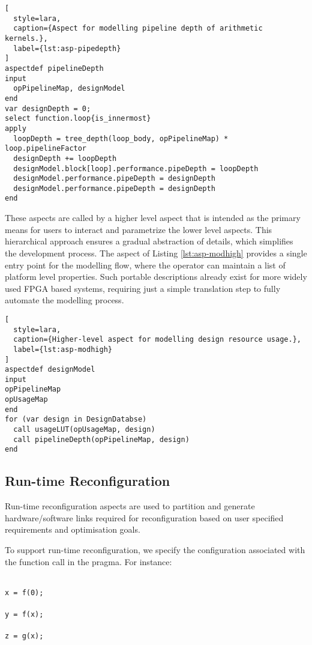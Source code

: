 \begin{lstlisting}[
  style=lara,
  caption={Aspect for modelling pipeline depth of arithmetic kernels.},
  label={lst:asp-pipedepth}
]
aspectdef pipelineDepth
input
  opPipelineMap, designModel
end
var designDepth = 0;
select function.loop{is_innermost}
apply
  loopDepth = tree_depth(loop_body, opPipelineMap) * loop.pipelineFactor
  designDepth += loopDepth
  designModel.block[loop].performance.pipeDepth = loopDepth
  designModel.performance.pipeDepth = designDepth
  designModel.performance.pipeDepth = designDepth
end
\end{lstlisting}

These aspects are called by a higher level aspect that is intended as
the primary means for users to interact and parametrize the lower
level aspects. This hierarchical approach ensures a gradual
abstraction of details, which simplifies the development process.  The
aspect of Listing \ref{lst:asp-modhigh} provides a single entry point
for the modelling flow, where the operator can maintain a list of
platform level properties. Such portable descriptions already exist
for more widely used FPGA based systems, requiring just a simple
translation step to fully automate the modelling process.

\begin{lstlisting}[
  style=lara,
  caption={Higher-level aspect for modelling design resource usage.},
  label={lst:asp-modhigh}
]
aspectdef designModel
input
opPipelineMap
opUsageMap
end
for (var design in DesignDatabse)
  call usageLUT(opUsageMap, design)
  call pipelineDepth(opPipelineMap, design)
end
\end{lstlisting}

\subsection{Run-time Reconfiguration}
\label{sect:asp_reconfig}


Run-time reconfiguration aspects are used to partition and generate
hardware/software links required for reconfiguration based on user
specified requirements and optimisation goals.

To support run-time reconfiguration, we specify the configuration
associated with the function call in the \FAST{} pragma. For instance:

\noindent\texttt{\footnotesize{\\
x = f(0); \\
\\
y = f(x); \\
\\
z = g(x); \\
}}

